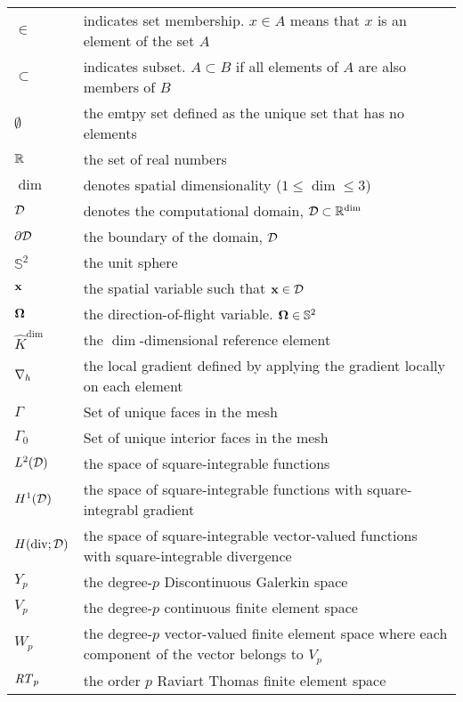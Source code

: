 \documentclass[../doc.tex]{subfiles}
\begin{document}
\begin{longtable}{p{2cm}p{12cm}}
$\in$ & indicates set membership. $x \in A$ means that $x$ is an element of the set $A$\\
$\subset$ & indicates subset. $A \subset B$ if all elements of $A$ are also members of $B$ \\
$\emptyset$ & the emtpy set defined as the unique set that has no elements \\
$\mathbb{R}$ & the set of real numbers \\
$\dim$ & denotes spatial dimensionality ($1\leq \dim \leq 3$) \\
$\mathcal{D}$ & denotes the computational domain, $\mathcal{D} \subset \mathbb{R}^{\dim}$\\ 
$\partial\mathcal{D}$ & the boundary of the domain, $\mathcal{D}$ \\
$\mathbb{S}^2$ & the unit sphere \\
$\boldsymbol{\mathrm{x}}$ & the spatial variable such that $\boldsymbol{\mathrm{x}} \in \mathcal{D}$ \\
$\boldsymbol{\Omega}$ & the direction-of-flight variable. $\boldsymbol{\Omega}\in \mathbb{S}^2$\\

$\hat{K}^{\dim}$ & the $\dim$-dimensional reference element \\
$\nabla_h$ & the local gradient defined by applying the gradient locally on each element \\ 
$\Gamma$ & Set of unique faces in the mesh \\
$\Gamma_0$ & Set of unique interior faces in the mesh \\
$L^2(\mathcal{D})$ & the space of square-integrable functions \\ 
$H^1(\mathcal{D})$ & the space of square-integrable functions with square-integrabl gradient \\ 
$H(\operatorname{div};\mathcal{D})$ & the space of square-integrable vector-valued functions with square-integrable divergence \\ 
$Y_p$ & the degree-$p$ Discontinuous Galerkin space \\
$V_p$ & the degree-$p$ continuous finite element space \\ 
$W_p$ & the degree-$p$ vector-valued finite element space where each component of the vector belongs to $V_p$ \\ 
$\mathit{RT}_p$ & the order $p$ Raviart Thomas finite element space \\ 


\end{longtable}
\end{document}
